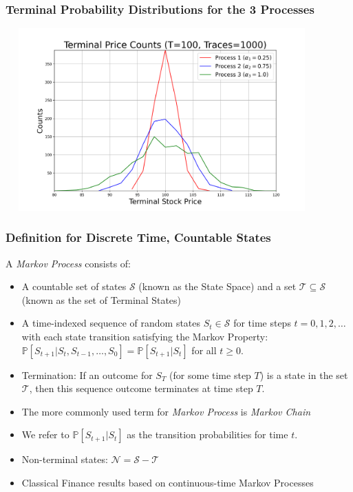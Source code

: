 \documentclass[handout]{beamer}
\begin{document}
\begin{frame}
\frametitle{Terminal Probability Distributions for the 3 Processes}
\includegraphics[width=12cm, height=7cm]{terminal_distribution.png}
\end{frame}

\begin{frame}
\frametitle{Definition for Discrete Time, Countable States}
\pause
\begin{definition}
 A {\em Markov Process} consists of:
 \begin{itemize}
 \item A countable set of states $\mathcal{S}$ (known as the State Space) and a set $\mathcal{T} \subseteq \mathcal{S}$ (known as the set of Terminal States)
 \item A time-indexed sequence of random states $S_t \in \mathcal{S}$ for time steps $t=0, 1, 2, \ldots$ with each state transition satisfying the Markov Property: $\mathbb{P}[S_{t+1}|S_t, S_{t-1}, \ldots, S_0] = \mathbb{P}[S_{t+1}|S_t]$ for all $t \geq 0$.
 \item Termination: If an outcome for $S_T$ (for some time step $T$) is a state in the set $\mathcal{T}$, then this sequence outcome terminates at time step $T$.
 \end{itemize}
 \end{definition}
 \pause
 \begin{itemize}[<+=>]
\item The more commonly used term for {\em Markov Process} is {\em Markov Chain}
\item We refer to $\mathbb{P}[S_{t+1}|S_t]$ as the transition probabilities for time $t$.
\item Non-terminal states: $\mathcal{N} = \mathcal{S} - \mathcal{T}$
\item Classical Finance results based on continuous-time Markov Processes
\end{itemize}
\end{frame}
\end{document}
